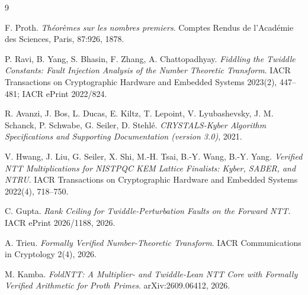 \documentclass{article}
\begin{document}
\begin{thebibliography}{9}

F. Proth.
\emph{Th\'eor\`emes sur les nombres premiers}.
Comptes Rendus de l'Acad\'emie des Sciences, Paris, 87:926, 1878.

P. Ravi, B. Yang, S. Bhasin, F. Zhang, A. Chattopadhyay.
\emph{Fiddling the Twiddle Constants: Fault Injection Analysis of the Number Theoretic Transform}.
IACR Transactions on Cryptographic Hardware and Embedded Systems 2023(2), 447--481; IACR ePrint 2022/824.

R. Avanzi, J. Bos, L. Ducas, E. Kiltz, T. Lepoint, V. Lyubashevsky, J. M. Schanck, P. Schwabe, G. Seiler, D. Stehl\'e.
\emph{CRYSTALS-Kyber Algorithm Specifications and Supporting Documentation (version 3.0)}, 2021.

V. Hwang, J. Liu, G. Seiler, X. Shi, M.-H. Tsai, B.-Y. Wang, B.-Y. Yang.
\emph{Verified NTT Multiplications for NISTPQC KEM Lattice Finalists: Kyber, SABER, and NTRU}.
IACR Transactions on Cryptographic Hardware and Embedded Systems 2022(4), 718--750.

C. Gupta.
\emph{Rank Ceiling for Twiddle-Perturbation Faults on the Forward NTT}.
IACR ePrint 2026/1188, 2026.

A. Trieu.
\emph{Formally Verified Number-Theoretic Transform}.
IACR Communications in Cryptology 2(4), 2026.

M. Kamba.
\emph{FoldNTT: A Multiplier- and Twiddle-Lean NTT Core with Formally Verified Arithmetic for Proth Primes}.
arXiv:2609.06412, 2026.

\end{thebibliography}
\end{document}
